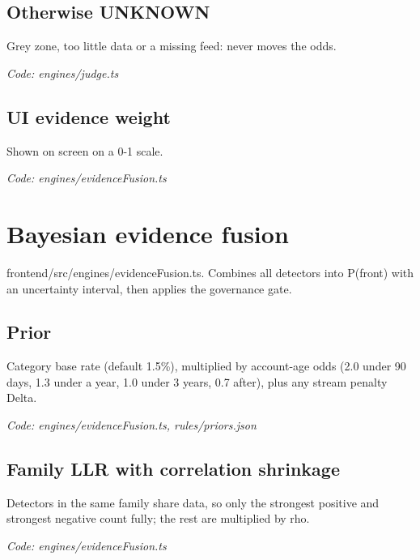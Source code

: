 \documentclass[11pt,a4paper]{article}
\newcommand{\where}[1]{\par{\small\itshape\color{mute}Code: #1}\par}
\begin{document}
\subsection*{Otherwise UNKNOWN}
\par\smallskip\noindent{}\par\smallskip
Grey zone, too little data or a missing feed: never moves the odds.
\where{engines/judge.ts}

\subsection*{UI evidence weight}
\par\smallskip\noindent{}\par\smallskip
Shown on screen on a 0-1 scale.
\where{engines/evidenceFusion.ts}

\clearpage
\section{Bayesian evidence fusion}
{\color{mute}frontend/src/engines/evidenceFusion.ts. Combines all detectors into P(front) with an uncertainty interval, then applies the governance gate.}

\subsection*{Prior}
\par\smallskip\noindent{}\par\smallskip
Category base rate (default 1.5\%), multiplied by account-age odds (2.0 under 90 days, 1.3 under a year, 1.0 under 3 years, 0.7 after), plus any stream penalty Delta.
\where{engines/evidenceFusion.ts, rules/priors.json}

\subsection*{Family LLR with correlation shrinkage}
\par\smallskip\noindent{}\par\smallskip
Detectors in the same family share data, so only the strongest positive and strongest negative count fully; the rest are multiplied by rho.
\where{engines/evidenceFusion.ts}
\end{document}
